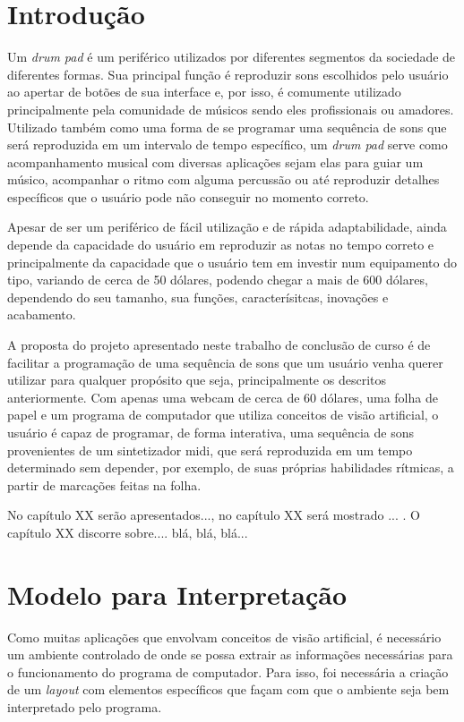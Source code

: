 \documentclass[12pt]{report}
\begin{document}

\chapter{Introdução}
\label{cha:introducao}

Um {\it drum pad} é um periférico utilizados por diferentes segmentos da sociedade de diferentes formas. Sua principal função é reproduzir sons escolhidos pelo usuário ao apertar de botões de sua interface e, por isso, é comumente utilizado principalmente pela comunidade de músicos sendo eles profissionais ou amadores.
Utilizado também como uma forma de se programar uma sequência de sons que será reproduzida em um intervalo de tempo específico, um {\it drum pad} serve como acompanhamento musical com diversas aplicações sejam elas para guiar um músico, acompanhar o ritmo com alguma percussão ou até reproduzir detalhes específicos que o usuário pode não conseguir no momento correto.

Apesar de ser um periférico de fácil utilização e de rápida adaptabilidade, ainda depende da capacidade do usuário em reproduzir as notas no tempo correto e principalmente da capacidade que o usuário tem em investir num equipamento do tipo, variando de cerca de 50 dólares, podendo chegar a mais de 600 dólares, dependendo do seu tamanho, sua funções, caracterísitcas, inovações e acabamento.

A proposta do projeto apresentado neste trabalho de conclusão de curso é de facilitar a programação de uma sequência de sons que um usuário venha querer utilizar para qualquer propósito que seja, principalmente os descritos anteriormente. Com apenas uma webcam de cerca de 60 dólares, uma folha de papel e um programa de computador que utiliza conceitos de visão artificial, o usuário é capaz de programar, de forma interativa, uma sequência de sons provenientes de um sintetizador midi, que será reproduzida em um tempo determinado sem depender, por exemplo, de suas próprias habilidades rítmicas, a partir de marcações feitas na folha.

No capítulo XX serão apresentados..., no capítulo XX será mostrado
... . O capítulo XX discorre sobre.... blá, blá, blá...

\chapter{Modelo para Interpretação}
\label{cha:fund-teor}

Como muitas aplicações que envolvam conceitos de visão artificial, é necessário um ambiente controlado de onde se possa extrair as informações necessárias para o funcionamento do programa de computador. Para isso, foi necessária a criação de um {\it layout} com elementos específicos que façam com que o ambiente seja bem interpretado pelo programa.
\end{document}
